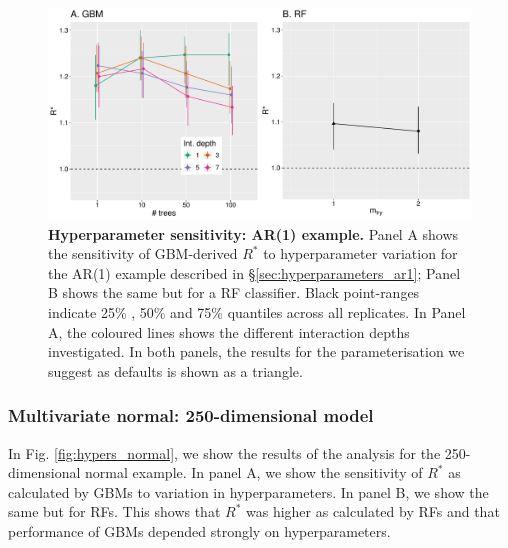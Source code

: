 \documentclass[ba]{imsart}
\numberwithin{equation}{section}
\theoremstyle{plain}
\begin{document}
\begin{supplement}
		\begin{figure}[!htb]
			\centerline{\includegraphics[width=1.0\textwidth]{hypers_ar1.pdf}}
			\caption{\textbf{Hyperparameter sensitivity: AR(1) example.} Panel A shows the sensitivity of GBM-derived $R^*$ to hyperparameter variation for the AR(1) example described in \S\ref{sec:hyperparameters_ar1}; Panel B shows the same but for a RF classifier. Black point-ranges indicate 25\% , 50\% and 75\% quantiles across all replicates. In Panel A, the coloured lines shows the different interaction depths investigated. In both panels, the results for the parameterisation we suggest as defaults is shown as a triangle.}
			\label{fig:hypers_ar1}
		\end{figure}
		
		\subsubsection{Multivariate normal: 250-dimensional model}\label{sec:hyperparameters_normal}
		In Fig. \ref{fig:hypers_normal}, we show the results of the analysis for the 250-dimensional normal example. In panel A, we show the sensitivity of $R^*$ as calculated by GBMs to variation in hyperparameters. In panel B, we show the same but for RFs. This shows that $R^*$ was higher as calculated by RFs and that performance of GBMs depended strongly on hyperparameters.
		

\end{supplement}
\end{document}
